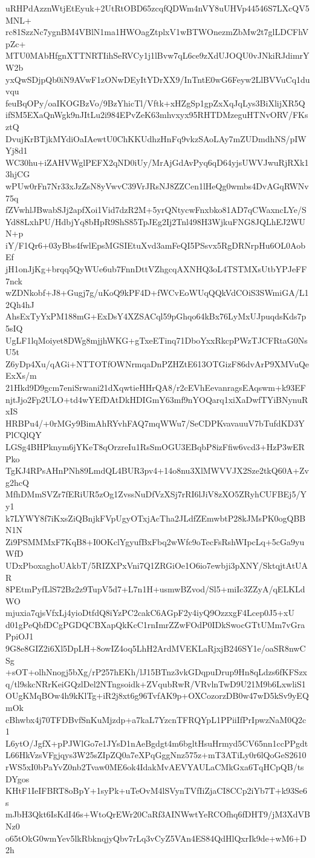 uRHPdAzznWtjEtEyuk+2UtRtOBD65zcqfQDWm4nVY8uUHVp44546S7LXcQV5MNL+
rc81SzzNc7ygnBM4VBlN1ma1HWOagZtplxV1wBTWOnezmZbMw2t7glLDCFhVpZc+
MTU0MAbHfgnXTTNRTIihSeRVCy1j1lBvw7qL6ce9zXdUJOQU0vJNkiRJdimrYW2b
yxQwSDjpQb0iN9AVwF1zONwDEyItYDrXX9/InTntE0wG6Feyw2LlBVVuCq1duvqu
feuBqOPy/oaIKOGBzVo/9BzYhicTl/Vftk+xHZgSp1gpZxXqJqLys3BiXlijXR5Q
ifSM5EXaQnWgk9nJItLu2i984EPvZeK63mhvxyx95RHTDMzeguHTNvORV/FKsztQ
DvujKrBTjkMYdiOaIAewtU0ChKKUdhzHnFq9vkzSAoLAy7mZUDmdhNS/pIWYj8d1
WC30hu+iZAHVWglPEFX2qND0iUy/MrAjGdAvPyq6qD64yjsUWVJwuRjRXk13hjCG
wPUw0rFn7Nr33xJzZsN8yVwvC39VrJRsNJ8ZZCen1lHeQg0wmbs4DvAGqRWNv75q
fZVwhlJBwabSJj2apfXoi1Vid7dzR2M+5yrQNtycwFnxbko81AD7qCWaxncLYe/S
Yd88LxhPU/HdbjYq8bHpR9ShS85TpJEg2Ij2Tnl498H3WjkuFNG8JQLhEJ2WUN+p
iY/F1Qr6+03yBbs4fwlEpsMGSIEtuXvd3amFeQI5PSsvx5RgDRNrpHu6OL0AobEf
jH1onJjKg+brqq5QyWUe6ub7FnnDttVZhgcqAXNHQ3oL4TSTMXsUtbYPJeFF7nck
wZDNkobf+J8+Gugj7g/uKoQ9kPF4D+fWCvEoWUqQQkVdCOiS3SWmiGA/L12Qh4hJ
AhsExTyYxPM188mG+ExDsY4XZSACql59pGhqo64kBx76LyMxUJpuqdsKds7p5sIQ
UgLF1lqMoiyet8DWg8mjjhWKG+gTxeETinq71DboYxxRkcpPWzTJCFRtaG0NsU5t
Z6yDp4Xu/qAGi+NTTOTfOWNrmqaDnPZHZtE613OTGizF86dvArP9XMVuQeExXs/m
21Hkd9D9gcm7eniSrwani21dXqwtieHHrQA8/r2cEVhEevanragsEAqswm+k93EF
njtJjo2Fp2ULO+td4wYEfDAtDkHDIGmY63mf9nYOQarq1xiXaDwfTYiBNynuRxIS
HRBPu4/+0rMGy9BimAhRYvhFAQ7mqWWu7/SeCDPKvavauuV7bTufdKD3YPlCQlQY
LGSg4BHPknym6jYKeT8qOrzreIu1RsSmOGU3EBqbP8izFfiw6vcd3+HzP3wERPko
TgKJ4RPsAHnPNh89LmdQL4BUR3pv4+14o8nu3XlMWVVJX2Sze2tkQ60A+Zvg2hcQ
MfhDMmSVZr7fERiUR5zOg1ZvssNuDfVzXSj7rRI6lJiV8zXO5ZRyhCUFBEj5/Yy1
k7LYWY8f7iKxsZiQBnjkFVpUgyOTxjAcTha2JLdfZEmwbtP28kJMsPK0ogQBBN1N
Zi9PSMMMxF7KqB8+I0OKclYgyufBxFbq2wWfc9oTecFsRshWIpcLq+5cGa9yuWfD
UDxPboxaghoUAkbT/5RIZXPxVni7Q1ZRGiOe1O6io7ewbji3pXNY/SktqjtAtUAR
8PEtmPyfLlS72Bz2z9TupV5d7+L7n1H+usmwBZvod/Sl5+miIc3ZZyA/qELKLdWO
mjuxia7qjsVfxLj4yioDtfdQ8iYzPC2cakC6AGpF2y4iyQ9OzzxgF4Lcep0J5+xU
d01gPeQbfDCgPGDQCBXapQkKcC1rnImrZZwFOdP0IDkSwocGTtUMm7vGraPpiOJ1
9G8e8GIZ2i6Xl5DpLH+8owIZ4oq5LhH2ArdMVEKLaRjxjB246SY1e/oaSR8nwCSg
+sOT+olhNnogj5bXg/rP257hEKh/lJ15BTnz3vkGDqpuDrup9Hn8qLdzs6fKFSzx
q/tl9skcNRrKeiGQzlDel2NTngsoidk+ZVqubRwR/VRvlnTwD9U21M9b6LxwliS1
OUgKMqBOw4h9kKlTg+iR2j8xt6g96TvfAK9p+OXCozorzDB0w47wD5kSv9yEQmOk
cBhwbx4j70TFDBvfSnKuMjzdp+a7kaL7YzcnTFRQYpL1PPiiIfPrIpwzNaM0Q2c1
L6ytO/JgfX+pPJWlGo7e1JYsD1nAeBgdgt4m6bgltHsuHrmyd5CV65nn1ccPPgdt
L66HkVzsVFgjqys3W25sZIpZQ0a7eXPqGggNnz575z+mT3ATiLy0r6lQoGeS2610
rWS5xI0bPaYvZ0nb2Tvaw0ME6ok4IdakMvAEVYAULaCMkGxa6TqHCpQB/tsDYgos
KHtF1IeIFBRT8oBpY+1syPk+uTeOvM4lSVynTVfIiZjaCI8CCp2iYb7T+k93Se6s
mJbH3Qkt6IsKdI46s+WtoQrEWr20CaRf3AINWwtYeRCOfhq6fDHT9/jM3XdVBNz0
o65tOkG0wmYev5lkRbknqjyQbv7rLq3vCyZ5VAn4ES84QdHlQxrIk9de+wM6+D2h
